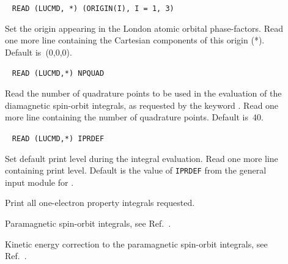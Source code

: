 \begin{description}
\item[]\verb| |\newline
\verb|READ (LUCMD, *) (ORIGIN(I), I = 1, 3)|

Set the origin appearing in the London atomic orbital phase-factors.
Read one more line containing the Cartesian components of this origin (*).
Default is~(0,0,0).

\item[]\verb| |\newline
\verb|READ (LUCMD,*) NPQUAD|

Read the number of quadrature points to be
used in the evaluation of
the diamagnetic spin-orbit integrals, as
requested by the keyword
. Read one more line containing the number of quadrature
points. Default is~40.

\item[]\verb| |\newline
\verb|READ (LUCMD,*) IPRDEF|

Set default print level during the integral evaluation.  Read one more line
containing print level. Default is the value of \verb|IPRDEF|
from the general input module for {\dalton}.

\item[] Print all one-electron property integrals requested.

\item[] Paramagnetic spin-orbit integrals, see
Ref.~\cite{ovhapjhjajsbpthjcp96}.


\item[] Kinetic energy correction to the paramagnetic
  spin-orbit integrals, see
Ref.~\cite{pmpljvkrjcp119}.



\end{description}
